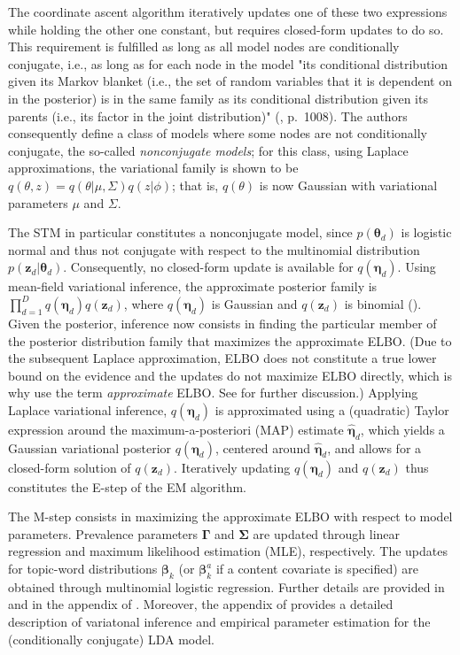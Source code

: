 The coordinate ascent algorithm iteratively updates one of these two expressions while holding the other one constant, but requires closed-form updates to do so. This requirement is fulfilled as long as all model nodes are conditionally conjugate, i.e., as long as for each node in the model "its conditional distribution given its Markov blanket (i.e., the set of random variables that it is dependent on in the posterior) is in the same family as its conditional distribution given its parents (i.e., its factor in the joint distribution)" (\cite{wang2013variational}, p.\ 1008). The authors consequently define a class of models where some nodes are not conditionally conjugate, the so-called \textit{nonconjugate models}; for this class, using Laplace approximations, the variational family is shown to be $q(\theta,z) = q(\theta|\mu,\Sigma)q(z|\phi)$; that is, $q(\theta)$ is now Gaussian with variational parameters $\mu$ and $\Sigma$.

The STM in particular constitutes a nonconjugate model, since $p(\boldsymbol{\theta}_d)$ is logistic normal and thus not conjugate with respect to the multinomial distribution $p(\boldsymbol{z}_d|\boldsymbol{\theta}_d)$. Consequently, no closed-form update is available for $q(\boldsymbol{\eta}_d)$. Using mean-field variational inference, the approximate posterior family is $\prod_{d=1}^{D}q(\boldsymbol{\eta}_d)q(\boldsymbol{z}_d)$, where $q(\boldsymbol{\eta}_d)$ is Gaussian and $q(\boldsymbol{z}_d)$ is binomial (\citealp{roberts2016model}). Given the posterior, inference now consists in finding the particular member of the posterior distribution family that maximizes the approximate ELBO. (Due to the subsequent Laplace approximation, ELBO does not constitute a true lower bound on the evidence and the updates do not maximize ELBO directly, which is why \cite{roberts2013structural} use the term \textit{approximate} ELBO. See \cite{wang2013variational} for further discussion.) Applying Laplace variational inference, $q(\boldsymbol{\eta}_d)$ is approximated using a (quadratic) Taylor expression around the maximum-a-posteriori (MAP) estimate $\hat{\boldsymbol{\eta}}_d$, which yields a Gaussian variational posterior $q(\boldsymbol{\eta}_d)$, centered around $\hat{\boldsymbol{\eta}}_d$, and allows for a closed-form solution of $q(\boldsymbol{z}_d)$. Iteratively updating $q(\boldsymbol{\eta}_d)$ and $q(\boldsymbol{z}_d)$ thus constitutes the E-step of the EM algorithm.

The M-step consists in maximizing the approximate ELBO with respect to model parameters. Prevalence parameters $\boldsymbol{\Gamma}$ and $\boldsymbol{\Sigma}$ are updated through linear regression and maximum likelihood estimation (MLE), respectively. The updates for topic-word distributions $\boldsymbol{\beta}_k$ (or $\boldsymbol{\beta}_k^{a}$ if a content covariate is specified) are obtained through multinomial logistic regression. Further details are provided in \cite{roberts2013structural} and in the appendix of \cite{roberts2013structural}. Moreover, the appendix of \cite{blei2003latent} provides a detailed description of variatonal inference and empirical parameter estimation for the (conditionally conjugate) LDA model.


